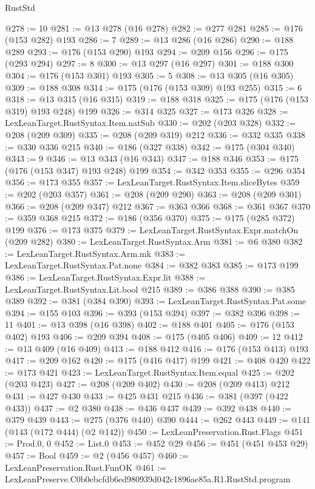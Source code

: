 \begin{lexlean}{RustStd}
\begin{coremodule}
@278 := 10
@281 := @13 @278 (@16 @278)
@282 := @277 @281
@285 := @176 (@153 @282) @193
@286 := 7
@289 := @13 @286 (@16 @286)
@290 := @188 @289
@293 := @176 (@153 @290) @193
@294 := @209 @156
@296 := @175 (@293 @294)
@297 := 8
@300 := @13 @297 (@16 @297)
@301 := @188 @300
@304 := @176 (@153 @301) @193
@305 := 5
@308 := @13 @305 (@16 @305)
@309 := @188 @308
@314 := @175 (@176 (@153 @309) @193 @255)
@315 := 6
@318 := @13 @315 (@16 @315)
@319 := @188 @318
@325 := @175 (@176 (@153 @319) @193 @248) @199
@326 := @314 @325
@327 := @173 @326
@328 := LexLeanTarget.RustSyntax.Item.natSub
@330 := @202 (@203 @328)
@332 := @208 (@209 @309)
@335 := @208 (@209 @319) @212
@336 := @332 @335
@338 := @330 @336 @215
@340 := @186 (@327 @338)
@342 := @175 (@304 @340)
@343 := 9
@346 := @13 @343 (@16 @343)
@347 := @188 @346
@353 := @175 (@176 (@153 @347) @193 @248) @199
@354 := @342 @353
@355 := @296 @354
@356 := @173 @355
@357 := LexLeanTarget.RustSyntax.Item.sliceBytes
@359 := @202 (@203 @357)
@361 := @208 (@209 @290)
@363 := @208 (@209 @301)
@366 := @208 (@209 @347) @212
@367 := @363 @366
@368 := @361 @367
@370 := @359 @368 @215
@372 := @186 (@356 @370)
@375 := @175 (@285 @372) @199
@376 := @173 @375
@379 := LexLeanTarget.RustSyntax.Expr.matchOn (@209 @282)
@380 := LexLeanTarget.RustSyntax.Arm
@381 := @6 @380
@382 := LexLeanTarget.RustSyntax.Arm.mk
@383 := LexLeanTarget.RustSyntax.Pat.none
@384 := @382 @383
@385 := @173 @199
@386 := LexLeanTarget.RustSyntax.Expr.lit
@388 := LexLeanTarget.RustSyntax.Lit.bool @215
@389 := @386 @388
@390 := @385 @389
@392 := @381 (@384 @390)
@393 := LexLeanTarget.RustSyntax.Pat.some
@394 := @155 @103
@396 := @393 (@153 @394)
@397 := @382 @396
@398 := 11
@401 := @13 @398 (@16 @398)
@402 := @188 @401
@405 := @176 (@153 @402) @193
@406 := @209 @394
@408 := @175 (@405 @406)
@409 := 12
@412 := @13 @409 (@16 @409)
@413 := @188 @412
@416 := @176 (@153 @413) @193
@417 := @209 @162
@420 := @175 (@416 @417) @199
@421 := @408 @420
@422 := @173 @421
@423 := LexLeanTarget.RustSyntax.Item.equal
@425 := @202 (@203 @423)
@427 := @208 (@209 @402)
@430 := @208 (@209 @413) @212
@431 := @427 @430
@433 := @425 @431 @215
@436 := @381 (@397 (@422 @433))
@437 := @2 @380
@438 := @436 @437
@439 := @392 @438
@440 := @379 @439
@443 := @275 (@376 @440) @390
@444 := @262 @443
@449 := @141 (@143 (@172 @444) (@2 @142))
@450 := LexLeanPreservation.Rust.Flags
@451 := Prod.{0, 0}
@452 := List.{0}
@453 := @452 @29
@456 := @451 (@451 @453 @29)
@457 := Bool
@459 := @2 (@456 @457)
@460 := LexLeanPreservation.Rust.FunOK
@461 := LexLeanPreserve.C0b0ebcfdb6ed980939d042c1896ae85a.R1.RustStd.program

\end{coremodule}
\end{lexlean}
